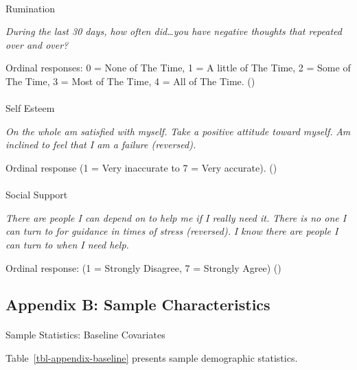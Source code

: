 \documentclass[
  single column]{article}
\makeatletter
\let\oldparagraph\paragraph
\renewcommand{\paragraph}{
    \@ifstar
      \xxxParagraphStar
      \xxxParagraphNoStar
  }
\newcommand{\xxxParagraphStar}[1]{\oldparagraph*{#1}\mbox{}}
\newcommand{\xxxParagraphNoStar}[1]{\oldparagraph{#1}\mbox{}}
\makeatother
\begin{document}
\paragraph{Rumination}\label{rumination}

\emph{During the last 30 days, how often did\ldots you have negative
thoughts that repeated over and over?}

Ordinal responses: 0 = None of The Time, 1 = A little of The Time, 2 =
Some of The Time, 3 = Most of The Time, 4 = All of The Time.
()

\paragraph{Self Esteem}\label{self-esteem}

\emph{On the whole am satisfied with myself.} \emph{Take a positive
attitude toward myself.} \emph{Am inclined to feel that I am a failure
(reversed).}

Ordinal response (1 = Very inaccurate to 7 = Very accurate).
()

\paragraph{Social Support}\label{social-support}

\emph{There are people I can depend on to help me if I really need it.}
\emph{There is no one I can turn to for guidance in times of stress
(reversed).} \emph{I know there are people I can turn to when I need
help.}

Ordinal response: (1 = Strongly Disagree, 7 = Strongly Agree)
()

\newpage{}

\subsection{Appendix B: Sample Characteristics}\label{appendix-sample}

\paragraph{Sample Statistics: Baseline
Covariates}\label{sample-statistics-baseline-covariates}

Table~\ref{tbl-appendix-baseline} presents sample demographic
statistics.
\end{document}
